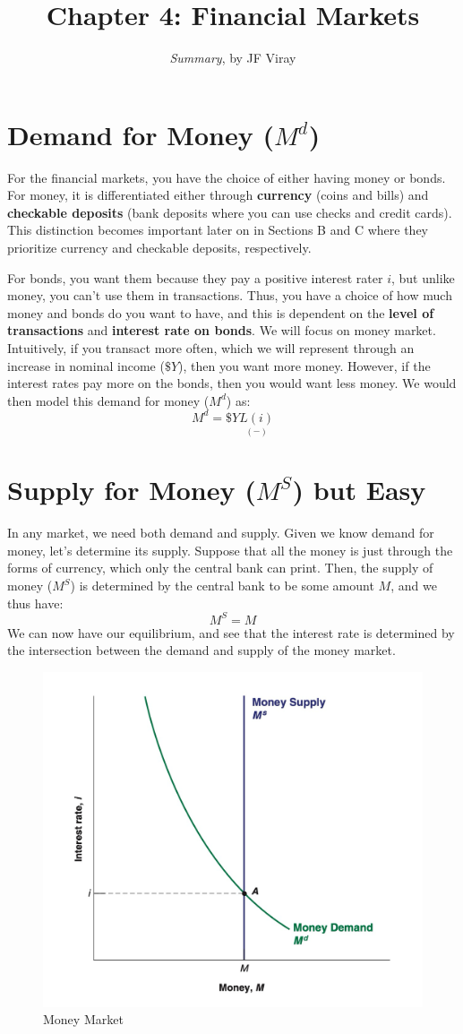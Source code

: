 \documentclass{extarticle}
\title{\vspace{-2em}Chapter 4: Financial Markets}
\author{\emph{Summary}, by JF Viray}
\date{}
\begin{document}
\maketitle



\section{Demand for Money ($M^d$)}
For the financial markets, you have the choice of either having money or bonds. For money, it is differentiated either through \textbf{currency} (coins and bills) and \textbf{checkable deposits} (bank deposits where you can use checks and credit cards). This distinction becomes important later on in Sections B and C where they prioritize currency and checkable deposits, respectively.

For bonds, you want them because they pay a positive interest rater $i$, but unlike money, you can't use them in transactions. Thus, you have a choice of how much money and bonds do you want to have, and this is dependent on the \textbf{level of transactions} and \textbf{interest rate on bonds}. We will focus on money market. Intuitively, if you transact more often, which we will represent through an increase in nominal income ($\$Y$), then you want more money. However, if the interest rates pay more on the bonds, then you would want less money. We would then model this demand for money ($M^d$) as:
$$M^d = \$Y \underset{(-)}{L(i)}$$
\section{Supply for Money ($M^S$) but Easy}
In any market, we need both demand and supply. Given we know demand for money, let's determine its supply. Suppose that all the money is just through the forms of currency, which only the central bank can print. Then, the supply of money ($M^S$) is determined by the central bank to be some amount $M$, and we thus have:
$$M^S = M$$
We can now have our equilibrium, and see that the interest rate is determined by the intersection between the demand and supply of the money market. 
\begin{figure}[h]
  \centering
  \includegraphics[width=0.5\linewidth]{money_market.png}
  \caption{Money Market}
  \label{fig:money}
\end{figure}
\end{document}
